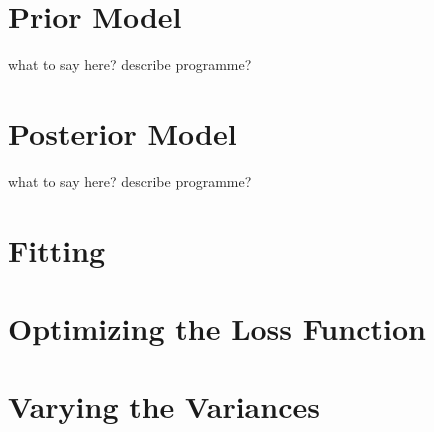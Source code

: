 \section{Prior Model}
what to say here? describe programme?
\section{Posterior Model}
what to say here? describe programme?

\section{Fitting}

\section{Optimizing the Loss Function}

\section{Varying the Variances}

